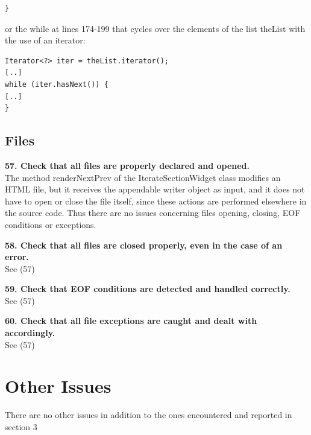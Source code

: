 \documentclass{article}
\begin{document}
\begin{flushleft}
\begin{lstlisting}
}
\end{lstlisting}
\vspace{0.5cm}
or the while at lines 174-199 that cycles over the elements of the list  theList with the use of an iterator:\\
\vspace{0.5cm}

\begin{lstlisting}
Iterator<?> iter = theList.iterator();
[..]
while (iter.hasNext()) {
[..]
}
\end{lstlisting}
\vspace{0.5cm}

\subsection{Files}

\textbf{57. Check that all files are properly declared and opened.}\\
\vspace{0.5cm}
The method renderNextPrev of the IterateSectionWidget  class modifies an HTML file, but it receives the appendable writer object as input, and it does not have to open or close the file itself, since these actions are performed elsewhere in the source code.
Thus there are no issues concerning files opening, closing, EOF conditions or exceptions.\\
\vspace{0.5cm}


\textbf{58. Check that all files are closed properly, even in the case of an error.}\\
\vspace{0.5cm}
See (57)\\
\vspace{0.5cm}

\textbf{59. Check that EOF conditions are detected and handled correctly.}\\
\vspace{0.5cm}
See (57)\\
\vspace{0.5cm}

\textbf{60. Check that all file exceptions are caught and dealt with accordingly.}\\
See (57)\\
\vspace{0.5cm}
\vspace{0.5cm}





\section{Other Issues}
\vspace{0.5cm}
There are no other issues in addition to the ones encountered and reported in section 3\\
\vspace{0.5cm}




\end{flushleft}
\end{document}
